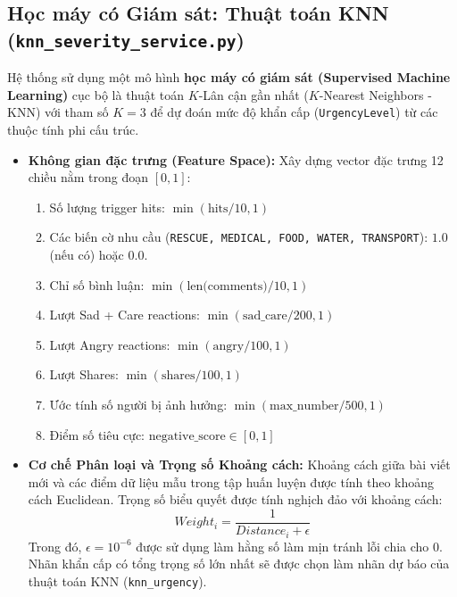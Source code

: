 \documentclass[12pt,a4paper]{article}
\begin{document}
\begin{itemize}
\subsection{Học máy có Giám sát: Thuật toán KNN (\texttt{knn\_severity\_service.py})}
Hệ thống sử dụng một mô hình \textbf{học máy có giám sát (Supervised Machine Learning)} cục bộ là thuật toán $K$-Lân cận gần nhất ($K$-Nearest Neighbors - KNN) với tham số $K=3$ để dự đoán mức độ khẩn cấp (\texttt{UrgencyLevel}) từ các thuộc tính phi cấu trúc.
\begin{itemize}
    \item \textbf{Không gian đặc trưng (Feature Space):} Xây dựng vector đặc trưng 12 chiều nằm trong đoạn $[0,1]$:
        \begin{enumerate}
            \item Số lượng trigger hits: $\min(\text{hits} / 10, 1)$
            \item Các biến cờ nhu cầu (\texttt{RESCUE, MEDICAL, FOOD, WATER, TRANSPORT}): $1.0$ (nếu có) hoặc $0.0$.
            \item Chỉ số bình luận: $\min(\text{len(comments)} / 10, 1)$
            \item Lượt Sad + Care reactions: $\min(\text{sad\_care} / 200, 1)$
            \item Lượt Angry reactions: $\min(\text{angry} / 100, 1)$
            \item Lượt Shares: $\min(\text{shares} / 100, 1)$
            \item Ước tính số người bị ảnh hưởng: $\min(\text{max\_number} / 500, 1)$
            \item Điểm số tiêu cực: $\text{negative\_score} \in [0, 1]$
        \end{enumerate}
    \item \textbf{Cơ chế Phân loại và Trọng số Khoảng cách:} Khoảng cách giữa bài viết mới và các điểm dữ liệu mẫu trong tập huấn luyện được tính theo khoảng cách Euclidean. Trọng số biểu quyết được tính nghịch đảo với khoảng cách:
        \begin{equation}
        Weight_i = \frac{1}{Distance_i + \epsilon}
        \end{equation}
        Trong đó, $\epsilon = 10^{-6}$ được sử dụng làm hằng số làm mịn tránh lỗi chia cho $0$. Nhãn khẩn cấp có tổng trọng số lớn nhất sẽ được chọn làm nhãn dự báo của thuật toán KNN (\texttt{knn\_urgency}).
\end{itemize}


\end{itemize}
\end{document}
